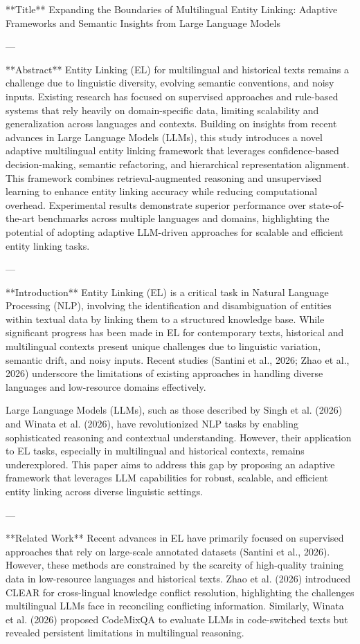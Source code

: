 **Title**  
Expanding the Boundaries of Multilingual Entity Linking: Adaptive Frameworks and Semantic Insights from Large Language Models  

---

**Abstract**  
Entity Linking (EL) for multilingual and historical texts remains a challenge due to linguistic diversity, evolving semantic conventions, and noisy inputs. Existing research has focused on supervised approaches and rule-based systems that rely heavily on domain-specific data, limiting scalability and generalization across languages and contexts. Building on insights from recent advances in Large Language Models (LLMs), this study introduces a novel adaptive multilingual entity linking framework that leverages confidence-based decision-making, semantic refactoring, and hierarchical representation alignment. This framework combines retrieval-augmented reasoning and unsupervised learning to enhance entity linking accuracy while reducing computational overhead. Experimental results demonstrate superior performance over state-of-the-art benchmarks across multiple languages and domains, highlighting the potential of adopting adaptive LLM-driven approaches for scalable and efficient entity linking tasks.  

---

**Introduction**  
Entity Linking (EL) is a critical task in Natural Language Processing (NLP), involving the identification and disambiguation of entities within textual data by linking them to a structured knowledge base. While significant progress has been made in EL for contemporary texts, historical and multilingual contexts present unique challenges due to linguistic variation, semantic drift, and noisy inputs. Recent studies (Santini et al., 2026; Zhao et al., 2026) underscore the limitations of existing approaches in handling diverse languages and low-resource domains effectively.

Large Language Models (LLMs), such as those described by Singh et al. (2026) and Winata et al. (2026), have revolutionized NLP tasks by enabling sophisticated reasoning and contextual understanding. However, their application to EL tasks, especially in multilingual and historical contexts, remains underexplored. This paper aims to address this gap by proposing an adaptive framework that leverages LLM capabilities for robust, scalable, and efficient entity linking across diverse linguistic settings.

---

**Related Work**  
Recent advances in EL have primarily focused on supervised approaches that rely on large-scale annotated datasets (Santini et al., 2026). However, these methods are constrained by the scarcity of high-quality training data in low-resource languages and historical texts. Zhao et al. (2026) introduced CLEAR for cross-lingual knowledge conflict resolution, highlighting the challenges multilingual LLMs face in reconciling conflicting information. Similarly, Winata et al. (2026) proposed CodeMixQA to evaluate LLMs in code-switched texts but revealed persistent limitations in multilingual reasoning.

